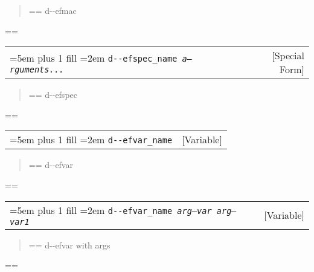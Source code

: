 \documentclass{book}
\makeatletter
\newenvironment{GNUTexinfopreformatted}{%
  \par\GNUTobeylines\obeyspaces\frenchspacing
  \parskip=\z@\parindent=\z@}{}
{\catcode`\^^M=13 \gdef\GNUTobeylines{\catcode`\^^M=13 \def^^M{\null\par}}}
\newenvironment{GNUTexinfoindented}
  {\begin{list}{}{}
  \item\relax}
  {\end{list}}
\makeatother
\begin{document}
\begin{GNUTexinfoindented}
%
\begin{quote}
\unskip{\parskip=0pt\noindent}%
\begin{GNUTexinfopreformatted}%
\ttfamily d{-}{-}efmac
\end{GNUTexinfopreformatted}
\end{quote}
\begin{GNUTexinfopreformatted}%
\ttfamily 
\end{GNUTexinfopreformatted}

\noindent\begin{tabularx}{\linewidth}{@{}Xr}
\rightskip=5em plus 1 fill
\hangindent=2em
\texttt{d{-}{-}efspec\_name \EmbracOn{}\textnormal{\textsl{a--rguments...}}\EmbracOff{}}& [Special Form]
\end{tabularx}

%
\begin{quote}
\unskip{\parskip=0pt\noindent}%
\begin{GNUTexinfopreformatted}%
\ttfamily d{-}{-}efspec
\end{GNUTexinfopreformatted}
\end{quote}
\begin{GNUTexinfopreformatted}%
\ttfamily 
\end{GNUTexinfopreformatted}

\noindent\begin{tabularx}{\linewidth}{@{}Xr}
\rightskip=5em plus 1 fill
\hangindent=2em
\texttt{d{-}{-}efvar\_name}& [Variable]
\end{tabularx}

%
\begin{quote}
\unskip{\parskip=0pt\noindent}%
\begin{GNUTexinfopreformatted}%
\ttfamily d{-}{-}efvar
\end{GNUTexinfopreformatted}
\end{quote}
\begin{GNUTexinfopreformatted}%
\ttfamily 
\end{GNUTexinfopreformatted}

\noindent\begin{tabularx}{\linewidth}{@{}Xr}
\rightskip=5em plus 1 fill
\hangindent=2em
\texttt{d{-}{-}efvar\_name \EmbracOn{}\textnormal{\textsl{arg--var arg--var1}}\EmbracOff{}}& [Variable]
\end{tabularx}

%
\begin{quote}
\unskip{\parskip=0pt\noindent}%
\begin{GNUTexinfopreformatted}%
\ttfamily d{-}{-}efvar with args
\end{GNUTexinfopreformatted}
\end{quote}
\begin{GNUTexinfopreformatted}%
\ttfamily 
\end{GNUTexinfopreformatted}


\end{GNUTexinfoindented}
\end{document}
